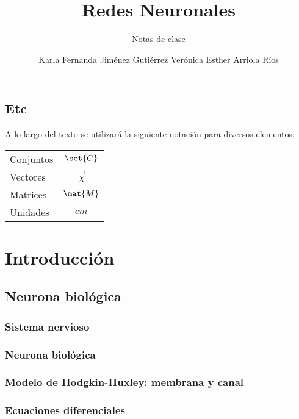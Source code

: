 \documentclass[12pt,openany]{book}
\title{Redes Neuronales}
\subtitle{Notas de clase}
\author{Karla Fernanda Jiménez Gutiérrez\newline
        Verónica Esther Arriola Ríos}
\begin{document}
\maketitle

\frontmatter %
\tableofcontents
\clearemptydoublepage %


\mainmatter  %


\chapter*{Etc}

A lo largo del texto se utilizará la siguiente notación para diversos elementos:
\begin{longtable}{lc}
 Conjuntos   &   $\set{C}$ \\
 Vectores    &   $\vec{X}$ \\
 Matrices    &   $\mat{M}$ \\
 Unidades    &   $\unit{cm}$
\end{longtable}



\part{Introducción}
\chapter{Neurona biológica}
\section{Sistema nervioso}
\section{Neurona biológica}
\section{Modelo de Hodgkin-Huxley: membrana y canal}
\section{Ecuaciones diferenciales}
\end{document}
